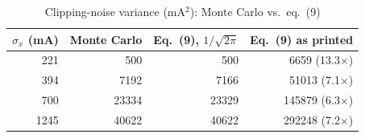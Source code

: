 \begin{table}[t]\centering\footnotesize
\caption{Clipping-noise variance (mA$^2$): Monte Carlo vs.\ eq.~(9)}\label{tab:mc}
\begin{tabular}{@{}rrrr@{}}\toprule
$\sigma_x$ (mA) & Monte Carlo & Eq.~(9), $1/\sqrt{2\pi}$ & Eq.~(9) as printed \\\midrule
221 & 500 & 500 & 6659 (13.3$\times$) \\
394 & 7192 & 7166 & 51013 (7.1$\times$) \\
700 & 23334 & 23329 & 145879 (6.3$\times$) \\
1245 & 40622 & 40622 & 292248 (7.2$\times$) \\
\bottomrule\end{tabular}\end{table}
